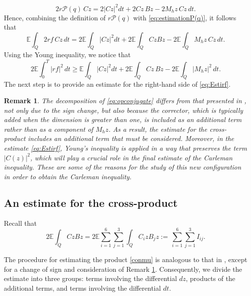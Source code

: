 \documentclass[11pt,oneside,leqno]{amsart}
\numberwithin{equation}{section}
\numberwithin{equation}{section}
\newcommand{\E}{\mathbb{E}}
\newtheorem{remark}[theorem]{Remark}
\begin{document}
\begin{equation}\label{eq:estimationP(q)}
    2r\mathcal{P}(q)\,Cz=2|Cz|^2dt+2Cz\,Bz-2M_hz\,Cz\,dt.
\end{equation}
Hence, combining the definition of $r\mathcal{P}(q)$ with \eqref{eq:estimationP(q)}, it follows that
\begin{equation*}
    \E \int_Q 2rf\,Cz\,dt=2\E \int_Q |Cz|^2dt+2\E \int_{Q}CzBz-2\E\int_{Q}
    M_hz\,Cz\,dt.
\end{equation*}
Using the Young inequality, we notice that
\begin{equation}\label{eq:Estirf}
    2\E \int_0^T |rf|^2\,dt \geq \E\int_{Q}|Cz|^2dt+ 2\E\int_{Q} Cz\,Bz -2\E \int_{Q}|M_{h}z|^2\,dt.
\end{equation}
The next step is to provide an estimate for the right-hand side of \eqref{eq:Estirf}.
\begin{remark}\label{remark:change}
The decomposition of \eqref{eq:opconjugate} differs from that presented in \cite{LPP:2025}, not only due to the sign change, but also because the corrector, which is typically added when the dimension is greater than one, is included as an additional term rather than as a component of $M_hz$. As a result, the estimate for the cross-product includes an additional term that must be considered.
Moreover, in the estimate \eqref{eq:Estirf}, Young's inequality is applied in a way that preserves the term $|C(z)|^2$, which will play a crucial role in the final estimate of the Carleman inequality. These are some of the reasons for the study of this new configuration in order to obtain the Carleman inequality.
\end{remark}
\subsection{An estimate for the cross-product}\label{sec:crossProduct}
Recall that 
\begin{equation}\label{conmu}
    2\E \int_Q CzBz =2\E \sum_{i=1}^{6}\sum_{j=1}^{3}\int_Q C_{i}zB_{j}z:=\,\sum_{i=1}^{6}\sum_{j=1}^{3}I_{ij}. 
\end{equation}

The procedure for estimating the product \eqref{conmu} is analogous to that in \cite{LPP:2025}, except for a change of sign and consideration of Remark \ref{remark:change}. Consequently, we divide the estimate into three groups: terms involving the differential $dz$, products of the additional terms, and terms involving the differential $dt$.
\end{document}
